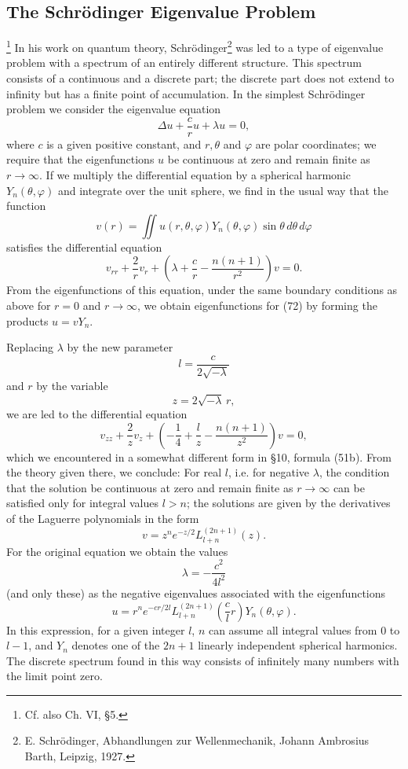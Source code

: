 \subsection{The Schr\"odinger Eigenvalue Problem}
\footnote{Cf. also Ch. VI, \S5.} In his work on quantum theory, Schr\"odinger\footnote{E. Schr\"odinger, Abhandlungen zur Wellenmechanik, Johann Ambrosius Barth, Leipzig, 1927.} was led to a type of eigenvalue problem with a spectrum of an entirely different structure. This spectrum consists of a continuous and a discrete part; the discrete part does not extend to infinity but has a finite point of accumulation. In the simplest Schr\"odinger problem we consider the eigenvalue equation
\begin{equation}
\Delta u+\frac{c}{r}u+\lambda u=0,
\tag{72}
\end{equation}
where $c$ is a given positive constant, and $r,\theta$ and $\varphi$ are polar coordinates; we require that the eigenfunctions $u$ be continuous at zero and remain finite as $r\to\infty$. If we multiply the differential equation by a spherical harmonic $Y_n(\theta,\varphi)$ and integrate over the unit sphere, we find in the usual way that the function
\[
v(r)=\iint u(r,\theta,\varphi)Y_n(\theta,\varphi)\sin\theta\,d\theta\,d\varphi
\]
satisfies the differential equation
\begin{equation}
v_{rr}+\frac2r v_r+\left(\lambda+\frac cr-\frac{n(n+1)}{r^2}\right)v=0.
\tag{73}
\end{equation}
From the eigenfunctions of this equation, under the same boundary conditions as above for $r=0$ and $r\to\infty$, we obtain eigenfunctions for (72) by forming the products $u=vY_n$.

Replacing $\lambda$ by the new parameter
\[
l=\frac{c}{2\sqrt{-\lambda}}
\]
and $r$ by the variable
\[
z=2\sqrt{-\lambda}\,r,
\]
we are led to the differential equation
\[
v_{zz}+\frac2zv_z+\left(-\frac14+\frac lz-\frac{n(n+1)}{z^2}\right)v=0,
\]
which we encountered in a somewhat different form in \S10, formula (51b). From the theory given there, we conclude: For real $l$, i.e. for negative $\lambda$, the condition that the solution be continuous at zero and remain finite as $r\to\infty$ can be satisfied only for integral values $l>n$; the solutions are given by the derivatives of the Laguerre polynomials in the form
\[
v=z^ne^{-z/2}L_{l+n}^{(2n+1)}(z).
\]
For the original equation we obtain the values
\[
\lambda=-\frac{c^2}{4l^2}
\]
(and only these) as the negative eigenvalues associated with the eigenfunctions
\[
u=r^ne^{-cr/2l}L_{l+n}^{(2n+1)}\left(\frac cl r\right)Y_n(\theta,\varphi).
\]
In this expression, for a given integer $l$, $n$ can assume all integral values from $0$ to $l-1$, and $Y_n$ denotes one of the $2n+1$ linearly independent spherical harmonics. The discrete spectrum found in this way consists of infinitely many numbers with the limit point zero.

